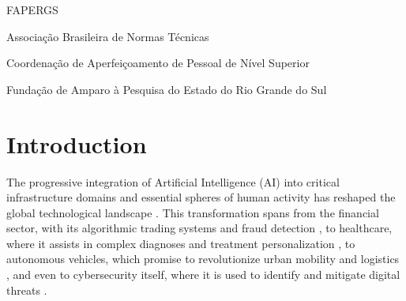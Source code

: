 \documentclass[twoside,brazilian,english]{UNISINOSmonografia}
\begin{document}
%
\begin{listadesiglas}{FAPERGS}
\item[ABNT] Associação Brasileira de Normas Técnicas
\item[CAPES] Coordenação de Aperfeiçoamento de Pessoal de Nível Superior
\item[FAPERGS] Fundação de Amparo à Pesquisa do Estado do Rio Grande do Sul
\end{listadesiglas}

%

\tableofcontents

\chapter{Introduction}

The progressive integration of Artificial Intelligence (AI) into critical infrastructure domains and essential spheres of human activity has reshaped the global technological landscape \cite{Russell2022}. This transformation spans from the financial sector, with its algorithmic trading systems and fraud detection \cite{Henrique2019}, to healthcare, where it assists in complex diagnoses and treatment personalization \cite{Rajpurkar2017, Chen2018}, to autonomous vehicles, which promise to revolutionize urban mobility and logistics \cite{Grigorescu2019}, and even to cybersecurity itself, where it is used to identify and mitigate digital threats \cite{Russell2022}.
\end{document}
